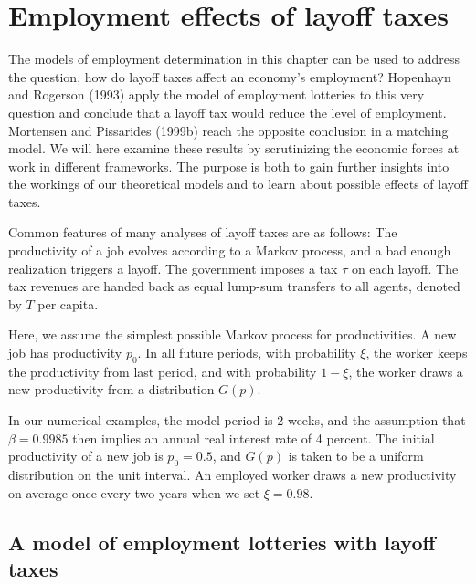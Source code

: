 \section{Employment effects of layoff taxes}

The models of employment determination in this chapter can be
used to address the question, how do layoff taxes affect an
economy's employment? Hopenhayn and Rogerson (1993)
apply the model of employment lotteries to this very question
and conclude that a layoff tax would reduce the level
of employment. Mortensen and Pissarides (1999b) reach the opposite
conclusion in a matching model.
We will here examine these results by
scrutinizing the economic forces at work in different
frameworks. The purpose is both to
gain further insights into the workings of our theoretical
models and to learn about possible effects of layoff
taxes.%
%
%

Common features of many analyses of layoff taxes
are as follows: The productivity of a job evolves
according to a Markov process, and a bad enough
realization triggers a layoff. The government imposes
a  tax $\tau$ on each layoff. \newpage \noindent  The tax revenues
are handed back as equal lump-sum transfers to all
agents, denoted by $T$ per capita.

Here, we assume the simplest possible Markov process
for productivities. A new job has productivity $p_0$.
In all future periods, with
probability $\xi$, the worker keeps the productivity
from last period, and with probability $1-\xi$,
the worker draws a new
productivity from a distribution $G(p)$.

In our numerical examples, the model period is 2 weeks,
and the assumption that $\beta=0.9985$ then implies an
annual real interest rate of 4 percent. The initial productivity
of a new job is $p_0=0.5$, and $G(p)$ is taken to be
a uniform distribution on the unit interval. An
employed worker draws a new productivity on average
once every two years when we set $\xi =0.98$.
\subsection{A model of employment lotteries with layoff taxes}

